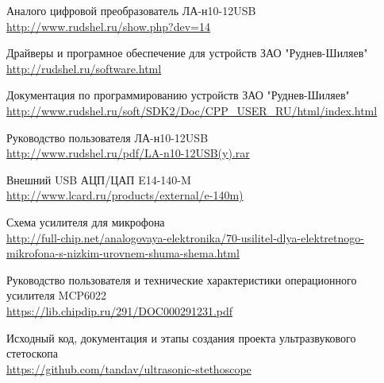 \newpage
\renewcommand\refname{Ссылки на источники}
\begin{thebibliography}{}
Аналого цифровой преобразователь ЛА-н10-12USB\\
\url{http://www.rudshel.ru/show.php?dev=14}

Драйверы и програмное обеспечение для устройств ЗАО "Руднев-Шиляев"\\
\url{http://rudshel.ru/software.html}

Документация по программированию устройств ЗАО "Руднев-Шиляев"\\
\url{http://www.rudshel.ru/soft/SDK2/Doc/CPP_USER_RU/html/index.html}

Руководство пользователя ЛА-н10-12USB\\
\url{http://www.rudshel.ru/pdf/LA-n10-12USB(y).rar}

Внешний USB АЦП/ЦАП E14-140-M\\
\url{http://www.lcard.ru/products/external/e-140m)}

Схема усилителя для микрофона\\
\url{http://full-chip.net/analogovaya-elektronika/70-usilitel-dlya-elektretnogo-mikrofona-s-nizkim-urovnem-shuma-shema.html}

Руководство пользователя и технические характеристики операционного усилителя MCP6022\\
\url{https://lib.chipdip.ru/291/DOC000291231.pdf}

Исходный код, документация и этапы создания проекта ультразвукового стетоскопа\\
\url{https://github.com/tandav/ultrasonic-stethoscope}

\end{thebibliography}



